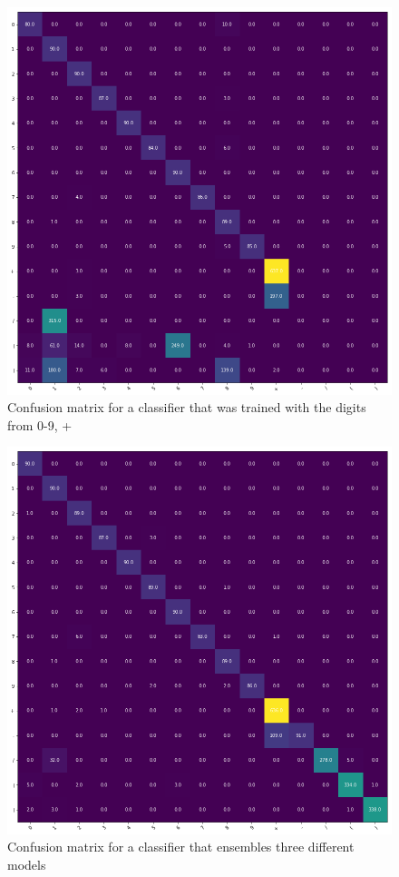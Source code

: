 \documentclass[11pt]{article}
\begin{document}
	\begin{figure}[H]
		\includegraphics[width=\textwidth]{ImagesForReport/confusion_matrix_single.png}
		\caption{Confusion matrix for a classifier that was trained with the digits from 0-9, +}
		\label{fig:mat-single}
	\end{figure}
	
	\begin{figure}[H]
		\includegraphics[width=\textwidth]{ImagesForReport/confusion_matrix_ensemble.png}
		\caption{Confusion matrix for a classifier that ensembles three different models}
		\label{fig:mat-ensemble}
	\end{figure}
	
\end{document}
